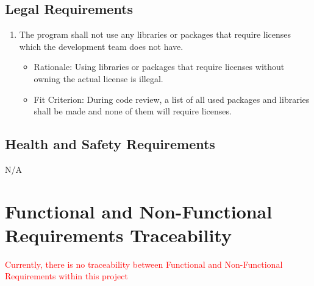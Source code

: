 \documentclass[12pt, titlepage]{article}
\begin{document}
\subsection{Legal Requirements}
\begin{enumerate}[{LR}1. ]
    \item \label{LR1} The program shall not use any libraries or packages that require licenses which the development team does not have.
    \begin{itemize}
        \item Rationale: Using libraries or packages that require licenses without owning the actual license is illegal.
        \item Fit Criterion: During code review, a list of all used packages and libraries shall be made and none of them will require licenses.
    \end{itemize}
\end{enumerate}

\subsection{Health and Safety Requirements}
N/A

\section{Functional and Non-Functional Requirements Traceability}
\textcolor{red}{Currently, there is no traceability between Functional and Non-Functional Requirements within this project}
\end{document}
